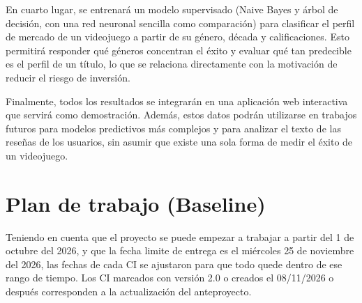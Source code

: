 \documentclass[letterpaper,11pt]{article}
\begin{document}
En cuarto lugar, se entrenará un modelo supervisado (Naive Bayes y árbol de decisión, con una red neuronal sencilla como comparación) para clasificar el perfil de mercado de un videojuego a partir de su género, década y calificaciones. Esto permitirá responder qué géneros concentran el éxito y evaluar qué tan predecible es el perfil de un título, lo que se relaciona directamente con la motivación de reducir el riesgo de inversión.

Finalmente, todos los resultados se integrarán en una aplicación web interactiva que servirá como demostración. Además, estos datos podrán utilizarse en trabajos futuros para modelos predictivos más complejos y para analizar el texto de las reseñas de los usuarios, sin asumir que existe una sola forma de medir el éxito de un videojuego.


\newpage
\section{Plan de trabajo (Baseline)}

Teniendo en cuenta que el proyecto se puede empezar a trabajar a partir del 1 de octubre del 2026, y que la fecha limite de entrega es el miércoles 25 de noviembre del 2026, las fechas de cada CI se ajustaron para que todo quede dentro de ese rango de tiempo. Los CI marcados con versión 2.0 o creados el 08/11/2026 o después corresponden a la actualización del anteproyecto.
\end{document}
